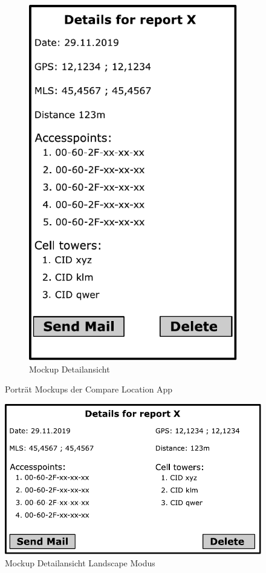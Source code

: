 \begin{figure}[H]
\begin{subfigure}{.4\textwidth}
		\includegraphics[width=.8\textwidth]{graphics/mockupdetailfragment}
		\caption{Mockup Detailansicht}
		\label{fig:mockDetail}
	\end{subfigure}
	\caption{Porträt Mockups der Compare Location App}
\end{figure}

\begin{figure}
	\centering
	\includegraphics[width=.6\textwidth]{graphics/mockupdetailfragmentlandscape}
	\caption{Mockup Detailansicht Landscape Modus}
	\label{fig:mockDetailLand}
\end{figure}


